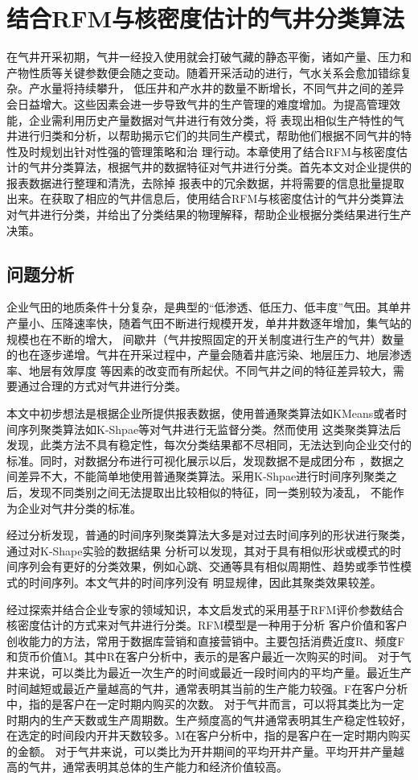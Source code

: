 \chapter{结合RFM与核密度估计的气井分类算法}
在气井开采初期，气井一经投入使用就会打破气藏的静态平衡，诸如产量、压力和产物性质等关键参数便会随之变动。随着开采活动的进行，气水关系会愈加错综复杂。产水量将持续攀升，
低压井和产水井的数量不断增长，不同气井之间的差异会日益增大。这些因素会进一步导致气井的生产管理的难度增加。为提高管理效能，企业需利用历史产量数据对气井进行有效分类，将
表现出相似生产特性的气井进行归类和分析，以帮助揭示它们的共同生产模式，帮助他们根据不同气井的特性及时规划出针对性强的管理策略和治
理行动。本章使用了结合RFM与核密度估计的气井分类算法，根据气井的数据特征对气井进行分类。首先本文对企业提供的报表数据进行整理和清洗，去除掉
报表中的冗余数据，并将需要的信息批量提取出来。在获取了相应的气井信息后，使用结合RFM与核密度估计的气井分类算法对气井进行分类，并给出了分类结果的物理解释，帮助企业根据分类结果进行生产决策。
\section{问题分析}
企业气田的地质条件十分复杂，是典型的“低渗透、低压力、低丰度”气田。其单井产量小、压降速率快，随着气田不断进行规模开发，单井井数逐年增加，集气站的规模也在不断的增大，
间歇井（气井按照固定的开关制度进行生产的气井）数量的也在逐步递增。气井在开采过程中，产量会随着井底污染、地层压力、地层渗透率、地层有效厚度
等因素的改变而有所起伏。不同气井之间的特征差异较大，需要通过合理的方式对气井进行分类。

本文中初步想法是根据企业所提供报表数据，使用普通聚类算法如KMeans或者时间序列聚类算法如K-Shpae等对气井进行无监督分类。然而使用
这类聚类算法后发现，此类方法不具有稳定性，每次分类结果都不尽相同，无法达到向企业交付的标准。同时，对数据分布进行可视化展示以后，发现数据不是成团分布
，数据之间差异不大，不能简单地使用普通聚类算法。采用K-Shpae进行时间序列聚类之后，发现不同类别之间无法提取出比较相似的特征，同一类别较为凌乱，
不能作为企业对气井分类的标准。

经过分析发现，普通的时间序列聚类算法大多是对过去时间序列的形状进行聚类，通过对K-Shape实验的数据结果\cite{Kshapeexperiment}
分析可以发现，其对于具有相似形状或模式的时间序列会有更好的分类效果，例如心跳、交通等具有相似周期性、趋势或季节性模式的时间序列。本文气井的时间序列没有
明显规律，因此其聚类效果较差。

经过探索并结合企业专家的领域知识，本文启发式的采用基于RFM评价参数结合核密度估计的方式来对气井进行分类。RFM模型是一种用于分析
客户价值和客户创收能力的方法，常用于数据库营销和直接营销中。主要包括消费近度R、频度F和货币价值M。其中R在客户分析中，表示的是客户最近一次购买的时间。
对于气井来说，可以类比为最近一次生产的时间或最近一段时间内的平均产量。最近生产时间越短或最近产量越高的气井，通常表明其当前的生产能力较强。F在客户分析中，指的是客户在一定时期内购买的次数。
对于气井而言，可以将其类比为一定时期内的生产天数或生产周期数。生产频度高的气井通常表明其生产稳定性较好，在选定的时间段内开井天数较多。M在客户分析中，指的是客户在一定时期内购买的金额。
对于气井来说，可以类比为开井期间的平均开井产量。平均开井产量越高的气井，通常表明其总体的生产能力和经济价值较高。

